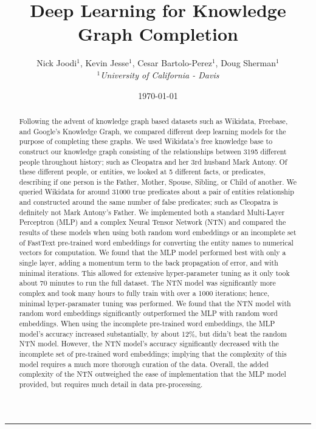 \documentclass[11.5pt]{article}
\begin{document}
\title{Deep Learning for Knowledge Graph Completion}
\author{Nick Joodi$^1$, Kevin Jesse$^1$, Cesar Bartolo-Perez$^1$, Doug Sherman$^1$\\
	{\small
	\textit{$^1$University of California - Davis}}
} 
\date{\today}
\maketitle
\rule{\textwidth}{1pt}

\begin{abstract}
Following the advent of knowledge graph based datasets such as Wikidata, Freebase, and Google's Knowledge Graph, we compared different deep learning models for the purpose of completing these graphs. We used Wikidata's free knowledge base to construct our knowledge graph consisting of the relationships between 3195 different people throughout history; such as Cleopatra and her 3rd husband Mark Antony.  Of these different people, or entities, we looked at 5 different facts, or predicates, describing if one person is the Father, Mother, Spouse, Sibling, or Child of another. We queried Wikidata for around 31000 true predicates about a pair of entities relationship and constructed around the same number of false predicates; such as Cleopatra is definitely not Mark Antony's Father.  We implemented both a standard Multi-Layer Perceptron (MLP) and a complex Neural Tensor Network (NTN) and compared the results of these models when using both random word embeddings or an incomplete set of FastText pre-trained word embeddings for converting the entity names to numerical vectors for computation. We found that the MLP model performed best with only a single layer, adding a momentum term to the back propagation of error, and with minimal iterations. This allowed for extensive hyper-parameter tuning as it only took about 70 minutes to run the full dataset. The NTN model was significantly more complex and took many hours to fully train with over a 1000 iterations; hence, minimal hyper-paramater tuning was performed. We found that the NTN model with random word embeddings significantly outperformed the MLP with random word embeddings. When using the incomplete pre-trained word embeddings, the MLP model's accuracy increased substantially, by about 12\%, but didn't beat the random NTN model. However, the NTN model's accuracy significantly decreased with the incomplete set of pre-trained word embeddings; implying that the complexity of this model requires a much more thorough curation of the data. Overall, the added complexity of the NTN outweighed the ease of implementation that the MLP model provided, but requires much detail in data pre-processing.

\end{abstract}
\end{document}
